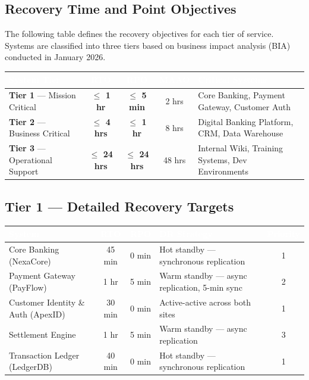 \documentclass[a4paper,11pt]{article}
\newcommand{\rpo}[1]{\textcolor{accent}{\textbf{#1}}}
\newcommand{\rto}[1]{\textcolor{alert}{\textbf{#1}}}
\begin{document}
\subsection{Recovery Time and Point Objectives}

The following table defines the recovery objectives for each tier of service. Systems are classified into three tiers based on business impact analysis (BIA) conducted in January 2026.

\begin{tcolorbox}[colback=lightgray, colframe=primary, boxrule=0.5pt, arc=3pt, left=10pt, right=10pt, top=8pt, bottom=8pt]
\begin{tabularx}{\textwidth}{@{}l c c c X@{}}
  \toprule
  \rowcolor{tablehead}
  \textcolor{white}{\textbf{System Tier}} & \textcolor{white}{\textbf{RTO}} & \textcolor{white}{\textbf{RPO}} & \textcolor{white}{\textbf{MAAO}} & \textcolor{white}{\textbf{Critical Systems}}\\
  \midrule
  \rowcolor{tablerow}
  \textbf{Tier 1} --- Mission Critical & \rto{$\leqslant$ 1 hr} & \rpo{$\leqslant$ 5 min} & 2 hrs & Core Banking, Payment Gateway, Customer Auth\\
  \textbf{Tier 2} --- Business Critical & \rto{$\leqslant$ 4 hrs} & \rpo{$\leqslant$ 1 hr} & 8 hrs & Digital Banking Platform, CRM, Data Warehouse\\
  \rowcolor{tablerow}
  \textbf{Tier 3} --- Operational Support & \rto{$\leqslant$ 24 hrs} & \rpo{$\leqslant$ 24 hrs} & 48 hrs & Internal Wiki, Training Systems, Dev Environments\\
  \bottomrule
\end{tabularx}
\end{tcolorbox}

\subsection{Tier 1 --- Detailed Recovery Targets}

\begin{tabularx}{\textwidth}{@{}l c c X c@{}}
  \toprule
  \rowcolor{tablehead}
  \textcolor{white}{\textbf{System}} & \textcolor{white}{\textbf{RTO}} & \textcolor{white}{\textbf{RPO}} & \textcolor{white}{\textbf{DR Strategy}} & \textcolor{white}{\textbf{Priority}}\\
  \midrule
  Core Banking (NexaCore) & 45 min & 0 min & Hot standby --- synchronous replication & 1\\
  \rowcolor{tablerow}
  Payment Gateway (PayFlow) & 1 hr & 5 min & Warm standby --- async replication, 5-min sync & 2\\
  Customer Identity \& Auth (ApexID) & 30 min & 0 min & Active-active across both sites & 1\\
  \rowcolor{tablerow}
  Settlement Engine & 1 hr & 5 min & Warm standby --- async replication & 3\\
  Transaction Ledger (LedgerDB) & 40 min & 0 min & Hot standby --- synchronous replication & 1\\
  \bottomrule
\end{tabularx}
\end{document}

